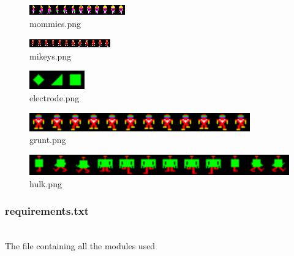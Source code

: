 \begin{figure}[H]
  \includegraphics[width=1\linewidth]{Game Code/sprites/mommies.png}
  \centering
  \caption{mommies.png}
  \label{fig:HCI5}
\end{figure}

\begin{figure}[H]
  \includegraphics[width=1\linewidth]{Game Code/sprites/mikeys.png}
  \centering
  \caption{mikeys.png}
  \label{fig:HCI5}
\end{figure}


\begin{figure}[H]
  \includegraphics[width=0.5\linewidth]{Game Code/sprites/electrode.png}
  \centering
  \caption{electrode.png}
  \label{fig:HCI5}
\end{figure}

\begin{figure}[H]
  \includegraphics[width=1\linewidth]{Game Code/sprites/grunt.png}
  \centering
  \caption{grunt.png}
  \label{fig:HCI5}
\end{figure}

\begin{figure}[H]
  \includegraphics[width=1\linewidth]{Game Code/sprites/hulk.png}
  \centering
  \caption{hulk.png}
  \label{fig:HCI5}
\end{figure}

\subsubsection{requirements.txt}\\
The file containing all the modules used


